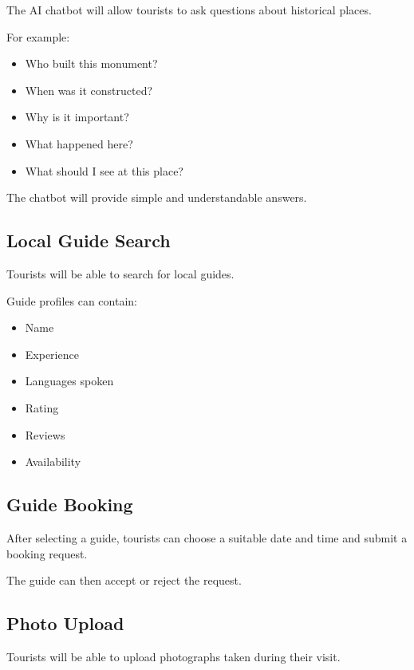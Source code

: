 \documentclass[12pt,a4paper]{article}
\begin{document}
The AI chatbot will allow tourists to ask questions about historical
places.

For example:

\begin{itemize}[leftmargin=*]

    \item Who built this monument?
    \item When was it constructed?
    \item Why is it important?
    \item What happened here?
    \item What should I see at this place?

\end{itemize}

The chatbot will provide simple and understandable answers.


\subsection{Local Guide Search}

Tourists will be able to search for local guides.

Guide profiles can contain:

\begin{itemize}[leftmargin=*]

    \item Name
    \item Experience
    \item Languages spoken
    \item Rating
    \item Reviews
    \item Availability

\end{itemize}


\subsection{Guide Booking}

After selecting a guide, tourists can choose a suitable date and time
and submit a booking request.

The guide can then accept or reject the request.


\subsection{Photo Upload}

Tourists will be able to upload photographs taken during their visit.
\end{document}
